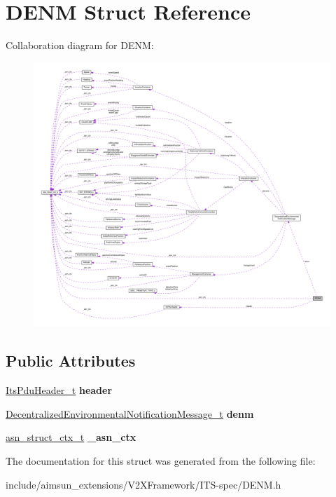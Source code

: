 \hypertarget{structDENM}{}\section{D\+E\+NM Struct Reference}
\label{structDENM}


Collaboration diagram for D\+E\+NM\+:\nopagebreak
\begin{figure}[H]
\begin{center}
\leavevmode
\includegraphics[width=350pt]{structDENM__coll__graph}
\end{center}
\end{figure}
\subsection*{Public Attributes}
\begin{DoxyCompactItemize}
\item 
\hyperlink{structItsPduHeader}{Its\+Pdu\+Header\+\_\+t} {\bfseries header}\hypertarget{structDENM_ad27e860ce2fa95ace9d448d63ec06439}{}\label{structDENM_ad27e860ce2fa95ace9d448d63ec06439}

\item 
\hyperlink{structDecentralizedEnvironmentalNotificationMessage}{Decentralized\+Environmental\+Notification\+Message\+\_\+t} {\bfseries denm}\hypertarget{structDENM_ace74ff6c1b62b60eeba94dc14df08147}{}\label{structDENM_ace74ff6c1b62b60eeba94dc14df08147}

\item 
\hyperlink{structasn__struct__ctx__s}{asn\+\_\+struct\+\_\+ctx\+\_\+t} {\bfseries \+\_\+asn\+\_\+ctx}\hypertarget{structDENM_a9ae03d21da21d735466137f5c8af5d67}{}\label{structDENM_a9ae03d21da21d735466137f5c8af5d67}

\end{DoxyCompactItemize}


The documentation for this struct was generated from the following file\+:\begin{DoxyCompactItemize}
\item 
include/aimsun\+\_\+extensions/\+V2\+X\+Framework/\+I\+T\+S-\/spec/D\+E\+N\+M.\+h\end{DoxyCompactItemize}
